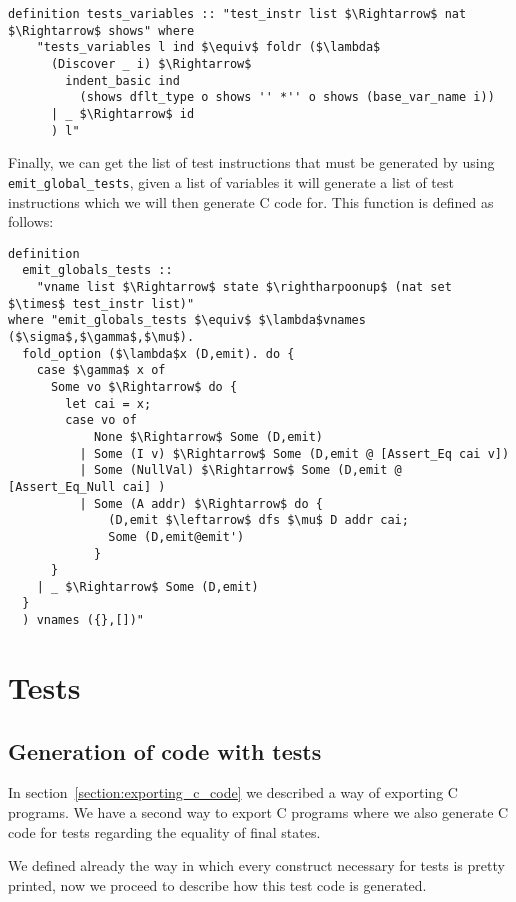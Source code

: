 \begin{lstlisting}[mathescape=true, frame=single]
  definition tests_variables :: "test_instr list $\Rightarrow$ nat $\Rightarrow$ shows" where
    "tests_variables l ind $\equiv$ foldr ($\lambda$
      (Discover _ i) $\Rightarrow$
        indent_basic ind
          (shows dflt_type o shows '' *'' o shows (base_var_name i))
      | _ $\Rightarrow$ id
      ) l"
\end{lstlisting}


Finally, we can get the list of test instructions that must be generated by using \verb|emit_global_tests|, given a list of variables it will generate a list of test instructions which we will then generate C code for.
This function is defined as follows:


\begin{lstlisting}[mathescape=true, frame=single]
definition
  emit_globals_tests ::
    "vname list $\Rightarrow$ state $\rightharpoonup$ (nat set $\times$ test_instr list)"
where "emit_globals_tests $\equiv$ $\lambda$vnames ($\sigma$,$\gamma$,$\mu$).
  fold_option ($\lambda$x (D,emit). do {
    case $\gamma$ x of
      Some vo $\Rightarrow$ do {
        let cai = x;
        case vo of
            None $\Rightarrow$ Some (D,emit)
          | Some (I v) $\Rightarrow$ Some (D,emit @ [Assert_Eq cai v])
          | Some (NullVal) $\Rightarrow$ Some (D,emit @ [Assert_Eq_Null cai] )
          | Some (A addr) $\Rightarrow$ do {
              (D,emit $\leftarrow$ dfs $\mu$ D addr cai;
              Some (D,emit@emit')
            }
      }
    | _ $\Rightarrow$ Some (D,emit)
  }
  ) vnames ({},[])"
\end{lstlisting}


\section{Tests}

\subsection{Generation of code with tests}

In section~\ref{section:exporting_c_code} we described a way of exporting C programs.
We have a second way to export C programs where we also generate C code for tests regarding the equality of final states.

We defined already the way in which every construct necessary for tests is pretty printed, now we proceed to describe how this test code is generated.

